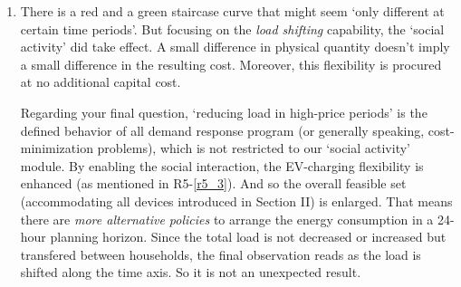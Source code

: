 \documentclass[11pt]{article}
\newcommand{\blue}[1]{\textcolor{blue}{#1}}
\begin{document}
\begin{enumerate}
    \par
    To tackle the above issue, the strategy we adopted was that we decide
    a proper value of $\mathbf{b}$ (the input to the min-cost problem)
    \textit{after} solving the min-rating problem (where we would have a concrete lower-bound limit).
    And the initial feasible solution (one for each block) to meet the assumption (in footnote 7, which relates to warm-up)
    was also collected during solving the min-rating problem.
    \blue{We've clarified these two facts in the footnotes in the revision.}
    \par
    We think the above strategy is a general skill rather than something closely related to the main idea of the paper.
    There is no theories suggesting one type of problem is harder than the other.
    (Note that the hardness of an MILP is not defined by the time entailed to let the gap drop to 0.01\%.
    You may use 1 second to attain 0.01\% and use 1 year to attain 0\%.)
    There is not many meaningful remarks we can make regarding the current behavior.
    \item \label{r5_7} There is a red and a green staircase curve that might seem `only different at certain time periods'.
    But focusing on the \textit{load shifting} capability, the `social activity' did take effect.
    A small difference in physical quantity doesn't imply a small difference in the resulting cost.
    Moreover, this flexibility is procured at no additional capital cost.
    \par
    Regarding your final question, `reducing load in high-price periods' is the defined behavior of all
    demand response program (or generally speaking, cost-minimization problems), which is not restricted to
    our `social activity' module.
    By enabling the social interaction, the EV-charging flexibility is enhanced (as mentioned in R5-\ref{r5_3}).
    And so the overall feasible set (accommodating all devices introduced in Section II) is enlarged. 
    That means there are \textit{more alternative policies} to arrange the energy consumption in a 24-hour planning horizon.
    Since the total load is not decreased or increased but transfered between households, the final
    observation reads as the load is shifted along the time axis. So it is not an unexpected result.
\end{enumerate}
\end{document}
